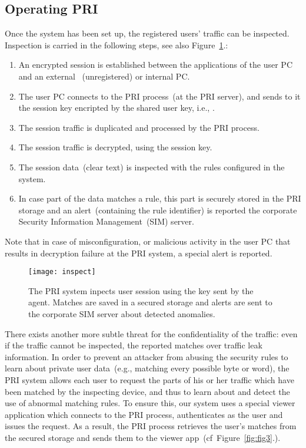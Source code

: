 \documentclass{sig-alternate-10pt}
\newcommand{\sys}{PRI\xspace}
\begin{document}
\subsection{Operating \sys}

Once the system has been set up, the registered users' traffic can be inspected. 
Inspection is carried in the following steps, see also Figure~\ref{fig:fig2}.:
\begin{enumerate}
\item 
An encrypted session is established between the applications of the user PC and an external ~(unregistered) or internal PC.
\item The user PC connects to the \sys process~(at the \sys server), and sends to it the session key encripted by the shared user key, i.e., .
\item The session traffic is duplicated and processed by the \sys process.
\item The session traffic is decrypted, using the session key.
\item  The session data~(clear text) is inspected with the rules configured in the system.
\item  In case part of the data matches a rule, this part is securely stored in the 
\sys storage and an alert~(containing the rule identifier) is reported the corporate 
Security Information Management~(SIM) server.  
\end{enumerate}

Note that in case of misconfiguration, or malicious activity in the user 
PC that results in decryption failure at the \sys system, a special alert is reported. 

\begin{figure}[t!]
\centering
\texttt{[image: inspect]}
\caption{The \sys system inpects user session using the key sent by the agent. Matches are saved in a secured storage and alerts are sent to the corporate SIM 
server about detected anomalies.}\label{fig:fig2}
\end{figure}

There exists another more subtle threat for the confidentiality of the traffic: 
even if the traffic cannot be inspected,
the reported matches over traffic 
leak information. 
In order to prevent an attacker from abusing the security rules to 
learn about 
private user data~(e.g., matching every possible byte or word), 
the \sys system allows each user to request the parts of his or her traffic 
which have been matched by the inspecting device, and thus to learn about and 
detect the use of abnormal matching rules. To ensure this, our system 
uses a special viewer application which connects to the \sys process, 
authenticates as the user and issues the request. As a result, the 
\sys process retrieves the user's matches from the secured storage 
and sends them to the viewer app~(cf~Figure~\ref{fig:fig3}.).
\end{document}
